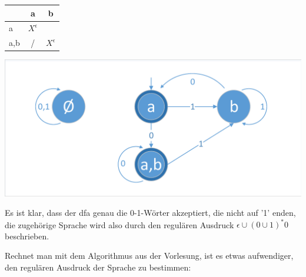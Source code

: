 \documentclass{article}
\begin{document}
\begin{minipage}{\textwidth}
	\begin{minipage}{0.5\textwidth}
		\centering
			\begin{tabular}{l|cc}
			& a & b\\\hline
			a & $X^\epsilon$  & \\
			a,b & / & $X^\epsilon$ \\
		\end{tabular}
	\end{minipage}
	\begin{minipage}{0.5\textwidth}
		\centering \includegraphics[width=\textwidth,page=2,trim={2 2 2 4},clip]{dfas.pdf}
	\end{minipage}
\end{minipage}

Es ist klar, dass der dfa genau die 0-1-Wörter akzeptiert, die nicht auf '1' enden, die zugehörige Sprache wird also durch den regulären Ausdruck $\epsilon \cup (0 \cup 1)^* 0$ beschrieben.

Rechnet man mit dem Algorithmus aus der Vorlesung, ist es etwas aufwendiger, den regulären Ausdruck der Sprache zu bestimmen:
\end{document}
